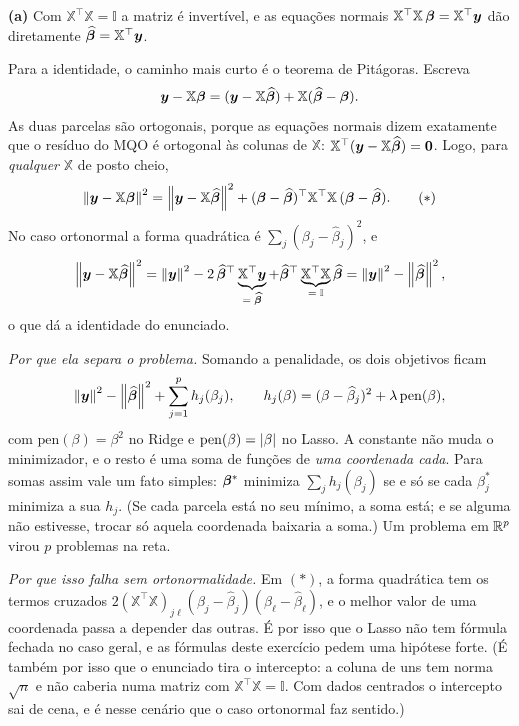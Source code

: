 \begin{solucao}
\textbf{(a)} Com $\mathbb{X}^\top\mathbb{X}=\mathbb{I}$ a matriz é invertível, e as
equações normais $\mathbb{X}^\top\mathbb{X}\,\bm{\beta}=\mathbb{X}^\top\bm y$ dão
diretamente $\widehat{\bm{\beta}}=\mathbb{X}^\top\bm y$.

Para a identidade, o caminho mais curto é o teorema de Pitágoras. Escreva
\[
  \bm y-\mathbb{X}\bm{\beta}=(\bm y-\mathbb{X}\widehat{\bm{\beta}})+\mathbb{X}(\widehat{\bm{\beta}}-\bm{\beta}).
\]
As duas parcelas são ortogonais, porque as equações normais dizem exatamente que o
resíduo do MQO é ortogonal às colunas de $\mathbb{X}$:
$\mathbb{X}^\top(\bm y-\mathbb{X}\widehat{\bm{\beta}})=\bm 0$. Logo, para \emph{qualquer}
$\mathbb{X}$ de posto cheio,
\[
  \left\lVert \bm y-\mathbb{X}\bm{\beta} \right\rVert^2
  =\left\lVert \bm y-\mathbb{X}\widehat{\bm{\beta}} \right\rVert^2
   +(\bm{\beta}-\widehat{\bm{\beta}})^\top\mathbb{X}^\top\mathbb{X}\,(\bm{\beta}-\widehat{\bm{\beta}}).
  \tag{$*$}
\]
No caso ortonormal a forma quadrática é $\sum_j(\beta_j-\widehat\beta_j)^2$, e
\[
  \left\lVert \bm y-\mathbb{X}\widehat{\bm{\beta}} \right\rVert^2
  =\left\lVert \bm y \right\rVert^2-2\,\widehat{\bm{\beta}}^\top\underbrace{\mathbb{X}^\top\bm y}_{=\;\widehat{\bm{\beta}}}
   +\widehat{\bm{\beta}}^\top\underbrace{\mathbb{X}^\top\mathbb{X}}_{=\;\mathbb{I}}\widehat{\bm{\beta}}
  =\left\lVert \bm y \right\rVert^2-\left\lVert \widehat{\bm{\beta}} \right\rVert^2 ,
\]
o que dá a identidade do enunciado.

\emph{Por que ela separa o problema.} Somando a penalidade, os dois objetivos ficam
\[
  \left\lVert \bm y \right\rVert^2-\left\lVert \widehat{\bm{\beta}} \right\rVert^2+\sum_{j=1}^p h_j(\beta_j),
  \qquad
  h_j(\beta)=(\beta-\widehat\beta_j)^2+\lambda\,\mathrm{pen}(\beta),
\]
com $\mathrm{pen}(\beta)=\beta^2$ no Ridge e $\mathrm{pen}(\beta)=\left\lvert \beta \right\rvert$ no
Lasso. A constante não muda o minimizador, e o resto é uma soma de funções de
\emph{uma coordenada cada}. Para somas assim vale um fato simples: $\bm{\beta}^\ast$
minimiza $\sum_jh_j(\beta_j)$ se e só se cada $\beta_j^\ast$ minimiza a sua $h_j$. (Se
cada parcela está no seu mínimo, a soma está; e se alguma não estivesse, trocar só
aquela coordenada baixaria a soma.) Um problema em $\mathbb{R}^p$ virou $p$ problemas na reta.

\emph{Por que isso falha sem ortonormalidade.} Em $(*)$, a forma quadrática tem os
termos cruzados $2(\mathbb{X}^\top\mathbb{X})_{j\ell}(\beta_j-\widehat\beta_j)(\beta_\ell-\widehat\beta_\ell)$,
e o melhor valor de uma coordenada passa a depender das outras. É por isso que o Lasso
não tem fórmula fechada no caso geral, e as fórmulas deste exercício pedem uma
hipótese forte. (É também por isso que o enunciado tira o intercepto: a coluna de uns
tem norma $\sqrt n$ e não caberia numa matriz com $\mathbb{X}^\top\mathbb{X}=\mathbb{I}$.
Com dados centrados o intercepto sai de cena, e é nesse cenário que o caso ortonormal
faz sentido.)


\end{solucao}
